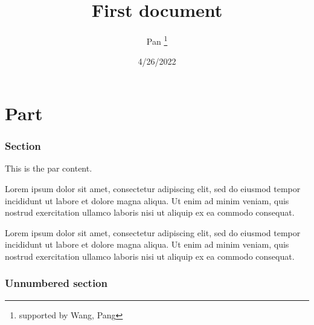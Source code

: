\documentclass[12pt, letterpaper]{article}
\title{First document}
\author{Pan \thanks{supported by Wang, Pang}}
\date{4/26/2022}
\begin{document}
	
	\begin{titlepage}
		\maketitle
	\end{titlepage}
	\tableofcontents
	\newpage
	
	
	\part{Part}
	\section{Section}
	This is the par content.
	\par
	Lorem ipsum dolor sit amet, consectetur adipiscing elit, sed do eiusmod tempor incididunt ut labore et dolore magna aliqua. Ut enim ad minim veniam, quis nostrud exercitation ullamco laboris nisi ut aliquip ex ea commodo consequat.
	\par
	Lorem ipsum dolor sit amet, consectetur adipiscing elit, sed do eiusmod tempor incididunt ut labore et dolore magna aliqua. Ut enim ad minim veniam, quis nostrud exercitation ullamco laboris nisi ut aliquip ex ea commodo consequat.
	\section*{Unnumbered section}
\end{document}
